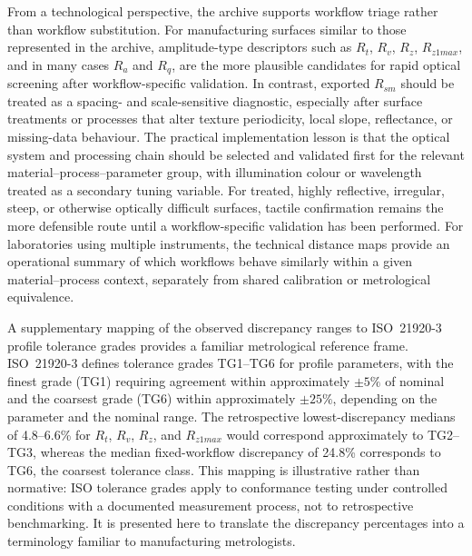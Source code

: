 \documentclass{article}
\begin{document}
From a technological perspective, the archive supports workflow triage rather than workflow substitution. For manufacturing surfaces similar to those represented in the archive, amplitude-type descriptors such as $R_t$, $R_v$, $R_z$, $R_{z1max}$, and in many cases $R_a$ and $R_q$, are the more plausible candidates for rapid optical screening after workflow-specific validation. In contrast, exported $R_{sm}$ should be treated as a spacing- and scale-sensitive diagnostic, especially after surface treatments or processes that alter texture periodicity, local slope, reflectance, or missing-data behaviour. The practical implementation lesson is that the optical system and processing chain should be selected and validated first for the relevant material--process--parameter group, with illumination colour or wavelength treated as a secondary tuning variable. For treated, highly reflective, irregular, steep, or otherwise optically difficult surfaces, tactile confirmation remains the more defensible route until a workflow-specific validation has been performed. For laboratories using multiple instruments, the technical distance maps provide an operational summary of which workflows behave similarly within a given material--process context, separately from shared calibration or metrological equivalence.

A supplementary mapping of the observed discrepancy ranges to ISO~21920-3 profile tolerance grades provides a familiar metrological reference frame. ISO~21920-3 defines tolerance grades TG1--TG6 for profile parameters, with the finest grade (TG1) requiring agreement within approximately $\pm 5\%$ of nominal and the coarsest grade (TG6) within approximately $\pm 25\%$, depending on the parameter and the nominal range. The retrospective lowest-discrepancy medians of 4.8--6.6\% for $R_t$, $R_v$, $R_z$, and $R_{z1max}$ would correspond approximately to TG2--TG3, whereas the median fixed-workflow discrepancy of 24.8\% corresponds to TG6, the coarsest tolerance class. This mapping is illustrative rather than normative: ISO tolerance grades apply to conformance testing under controlled conditions with a documented measurement process, not to retrospective benchmarking. It is presented here to translate the discrepancy percentages into a terminology familiar to manufacturing metrologists.
\end{document}
